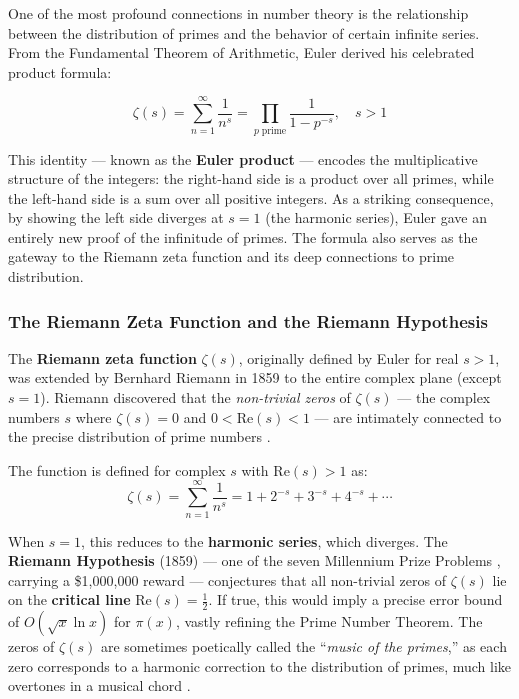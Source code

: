 \documentclass[11pt]{article}
\theoremstyle{plain}
\theoremstyle{definition}
\theoremstyle{remark}
\begin{document}
\par One of the most profound connections in number theory is the relationship between the distribution of primes and the behavior of certain infinite series. From the Fundamental Theorem of Arithmetic, Euler derived his celebrated product formula:

$$\zeta(s) = \sum_{n=1}^{\infty} \frac{1}{n^s} = \prod_{p\;\text{prime}} \frac{1}{1 - p^{-s}}, \quad s > 1$$

\par This identity --- known as the \textbf{Euler product} \cite{blog_euler_product,edwards_riemann_1974} --- encodes the multiplicative structure of the integers: the right-hand side is a product over all primes, while the left-hand side is a sum over all positive integers. As a striking consequence, by showing the left side diverges at $s = 1$ (the harmonic series), Euler gave an entirely new proof of the infinitude of primes. The formula also serves as the gateway to the Riemann zeta function and its deep connections to prime distribution.

\subsubsection{The Riemann Zeta Function and the Riemann Hypothesis}

\par The \textbf{Riemann zeta function} $\zeta(s)$, originally defined by Euler for real $s > 1$, was extended by Bernhard Riemann in 1859 to the entire complex plane (except $s = 1$). Riemann discovered that the \textit{non-trivial zeros} of $\zeta(s)$ --- the complex numbers $s$ where $\zeta(s) = 0$ and $0 < \mathrm{Re}(s) < 1$ --- are intimately connected to the precise distribution of prime numbers \cite{riemann_hypothesis_1859,britannica_riemann}.

\par The function is defined for complex $s$ with $\mathrm{Re}(s) > 1$ as:
$$\zeta(s) = \sum_{n=1}^{\infty} \frac{1}{n^s} = 1 + 2^{-s} + 3^{-s} + 4^{-s} + \cdots$$

\par When $s = 1$, this reduces to the \textbf{harmonic series}, which diverges. The \textbf{Riemann Hypothesis} (1859) \cite{riemann_hypothesis_1859} --- one of the seven Millennium Prize Problems \cite{clay_millennium}, carrying a \$1{,}000{,}000 reward \cite{clay_riemann} --- conjectures that all non-trivial zeros of $\zeta(s)$ lie on the \textbf{critical line} $\mathrm{Re}(s) = \frac{1}{2}$. If true, this would imply a precise error bound of $O(\sqrt{x} \ln x)$ for $\pi(x)$, vastly refining the Prime Number Theorem. The zeros of $\zeta(s)$ are sometimes poetically called the ``\textit{music of the primes},'' as each zero corresponds to a harmonic correction to the distribution of primes, much like overtones in a musical chord \cite{edwards_riemann_1974}.
\end{document}
